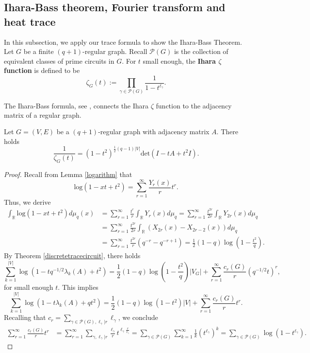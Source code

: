 \documentclass{article}
\begin{document}
\subsection{Ihara-Bass theorem, Fourier transform and heat trace}

In this subsection, we apply our trace formula to show the Ihara-Bass Theorem.
Let $G$ be a finite $(q+1)$-regular graph. Recall $\mathcal{P}(G)$ is the collection of equivalent classes of prime circuits in $G$. For $t$ small enough, the \textbf{Ihara $\zeta$ function} is defined to be 
    \begin{equation}
        \zeta_G(t):=\prod_{\gamma\in \mathcal{P}(G)}\frac{1}{1-t^{\ell_\gamma}}.
    \end{equation}

The Ihara-Bass formula, see \cite{BH92}, connects the Ihara $\zeta$ function to the adjacency matrix of a regular graph.


\begin{theorem}\label{iharabasseq} Let $G=(V,E)$ be a $(q+1)$-regular graph with adjacency matrix $A$. There holds
    \begin{equation}
        \frac{1}{\zeta_G(t)}=(1-t^2)^{\frac{1}{2}(q-1)|V|}\mathrm{det}(I-tA+t^2I).
    \end{equation}
\end{theorem}
\begin{proof}
Recall from Lemma \ref{logarithm} that 
\begin{equation*}
    \mathrm{log}(1-xt+t^2)=\sum_{r=1}^{\infty}\frac{Y_r(x)}{r}t^{r}.
\end{equation*}
Thus, we derive 
\begin{equation*}
\begin{aligned}
     \int_{\mathbb{R}}\mathrm{log}(1-xt+t^2)d\mu_q(x)&=\sum_{r=1}^{\infty}\frac{t^{r}}{r}\int_{\mathbb{R}}Y_r(x)d\mu_q=\sum_{r=1}^{\infty}\frac{t^{2r}}{2r}\int_{\mathbb{R}}Y_{2r}(x)d\mu_q\\
     &=\sum_{r=1}^{\infty}\frac{t^{2r}}{2r}\int_{\mathbb{R}}\left(X_{2r}(x)-X_{2r-2}(x)\right)d\mu_q\\
     &=\sum_{r=1}^{\infty}\frac{t^{2r}}{r}(q^{-r}-q^{-r+1})=\frac{1}{2}(1-q)\log\left(1-\frac{t^2}{q}\right).
\end{aligned}
\end{equation*}
By Theorem \ref{discretetracecircuit}, there holds
    $$\sum_{k=1}^{|V|} \log(1-tq^{-1/2}\lambda_k(A)+t^2)=
    \frac{1}{2}(1-q)\log(1-\frac{t^2}{q})|V_G|+\sum_{r=1}^{\infty}\frac{c_r(G)}{r}(q^{-1/2}t)^{r},$$for small enough $t$.
    This implies
    $$\sum_{k=1}^{|V|} \log(1-t\lambda_k(A)+qt^2)=
    \frac{1}{2}(1-q)\log(1-t^2)|V|+\sum_{r=1}^{\infty}\frac{c_r(G)}{r}t^{r}.$$
Recalling that $c_r=\sum_{\gamma \in \mathcal{P}(G),\ell_\gamma|r}\ell_\gamma$, we conclude
$$
\begin{aligned}
    \sum_{r=1}^{\infty}\frac{c_r(G)}{r}t^{r}&=\sum_{r=1}^{\infty}\sum_{\gamma,\ell_\gamma|r}\frac{\ell_\gamma}{r}t^{\ell_\gamma\frac{r}{\ell_\gamma}}=\sum_{\gamma \in \mathcal{P}(G)} \sum_{k=1}^{\infty} \frac{1}{k}(t^{\ell_\gamma})^k=\sum_{\gamma \in \mathcal{P}(G)} \log(1-t^{\ell_\gamma}).
\end{aligned}
$$
\end{proof}
\end{document}

